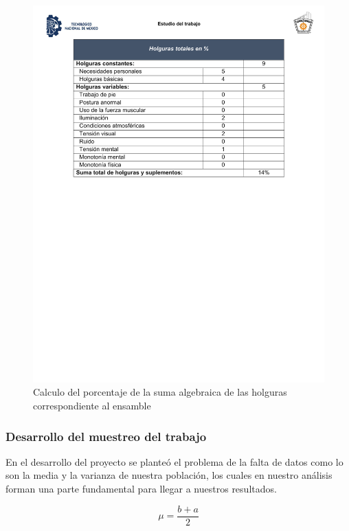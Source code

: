     \begin{figure}[H]
        \centering
        \includegraphics[trim = {22mm 145mm 20mm 20mm},clip,scale=0.4]{22/Img/holgurasTotales.pdf}
        \caption{Calculo del porcentaje de la suma algebraica de las holguras correspondiente al ensamble}
        \label{fig:HolguraTotal}
    \end{figure}
    
    
    
    
    
    
    \subsubsection{Desarrollo del muestreo del trabajo}
    En el desarrollo del proyecto se planteó el problema de la falta de datos como lo son la media y la varianza de nuestra población, los cuales en nuestro análisis forman una parte fundamental para llegar a nuestros resultados. 
    
     \begin{equation}
            \label{equ:media}
           \mu = \dfrac{b+a}{2}
        \end{equation}
    
